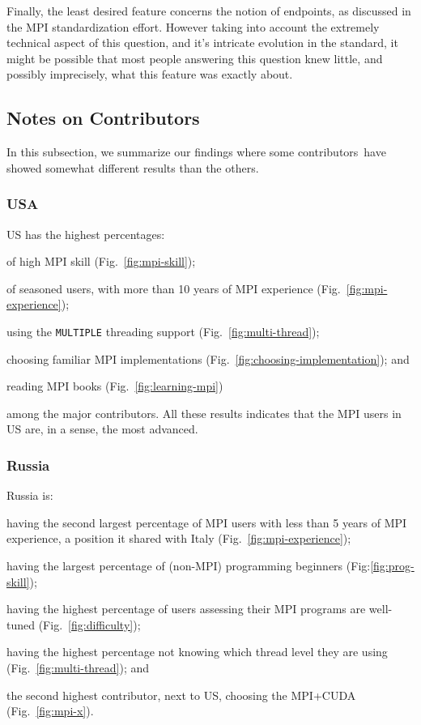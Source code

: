 \documentclass[preprint,5p,times]{elsarticle}
\newcommand{\revision}[2]{{\color{blue}#2}}
\def\country{contributor\xspace{}}%
\def\countries{contributors\xspace{}}%
\def\Countries{Contributors\xspace{}}%
\def\mcountries{major contributors\xspace{}}%
\begin{document}
Finally, the least desired feature concerns the notion of endpoints, as
discussed in the MPI standardization effort. However taking into account the
extremely technical aspect of this question, and it's intricate evolution in the
standard, it might be possible that most people answering this question knew
little, and possibly imprecisely, what this feature was exactly about.

\subsection{Notes on \Countries}

In this subsection, we summarize our findings where some
\revision{\countries have}{\countries\ have} showed
somewhat different results than the others.

\subsubsection*{USA}

US has the highest percentages:
\begin{enumerate*}
\item of high MPI skill (Fig.~\ref{fig:mpi-skill})\revision{,}{;}
\item of seasoned users, with more than 10 years of MPI experience (Fig.~\ref{fig:mpi-experience})\revision{,}{;}
\item using the {\tt MULTIPLE} threading support
  (Fig.~\ref{fig:multi-thread})\revision{,}{;}
\item choosing familiar MPI implementations
  (Fig.~\ref{fig:choosing-implementation})\revision{,}{;} and
\item reading MPI books (Fig.~\ref{fig:learning-mpi})
\end{enumerate*}
among the \mcountries. All these results indicates that the MPI
users in US are, \revision{by some standards}{in a sense,} the most advanced.

\subsubsection*{Russia}

Russia is:
\begin{enumerate*}
\item having the second largest percentage of MPI users with less than 5
  years of MPI experience, a position it shared with Italy
  (Fig.~\ref{fig:mpi-experience})\revision{,}{;}
\item having the largest percentage of (non-MPI) programming beginners
  (Fig:\ref{fig:prog-skill})\revision{,}{;}
\item having the highest percentage of users assessing their MPI programs are
  well-tuned (Fig.~\ref{fig:difficulty})\revision{,}{;}
\item having the highest percentage not knowing which thread level
  they are using (Fig.~\ref{fig:multi-thread})\revision{,}{;} and
\item the second highest \country, next to US, choosing the MPI+CUDA
  (Fig.~\ref{fig:mpi-x}).
\end{enumerate*}
\end{document}
